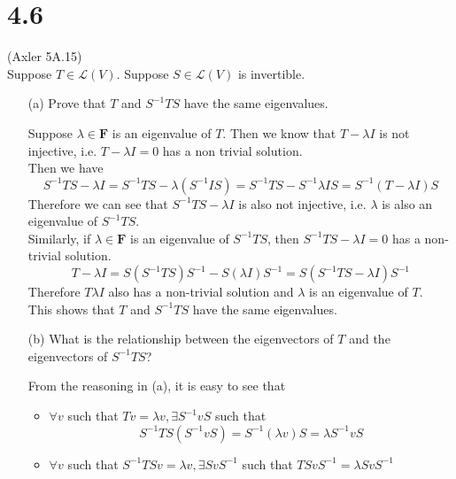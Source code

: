 \documentclass{article}
\begin{document}
\section*{4.6}
(Axler 5A.15)\\
Suppose $T \in \mathcal{L}(V)$. Suppose $S \in \mathcal{L}(V)$ is invertible.
\begin{itemize}
    \item[(a)] Prove that $T$ and $S^{-1}TS$ have the same eigenvalues.
    \begin{addmargin}[1em]{0em}
        Suppose $\lambda \in \mathbf{F}$ is an eigenvalue of $T$. Then we know that $T - \lambda I$ is not injective, i.e. $T - \lambda I = 0$ has a non trivial solution.\\
        Then we have
        \begin{equation*}
            S^{-1}TS - \lambda I = S^{-1}TS - \lambda (S^{-1}IS) = S^{-1}TS - S^{-1}\lambda IS = S^{-1}(T - \lambda I)S
        \end{equation*}
        Therefore we can see that $S^{-1}TS - \lambda I$ is also not injective, i.e. $\lambda$ is also an eigenvalue of $S^{-1}TS$.\\
        Similarly, if $\lambda \in \mathbf{F}$ is an eigenvalue of $S^{-1}TS$, then $S^{-1}TS - \lambda I = 0$ has a non-trivial solution.
        \begin{equation*}
            T - \lambda I = S(S^{-1}TS)S^{-1} - S(\lambda I)S^{-1} = S(S^{-1}TS - \lambda I)S^{-1}
        \end{equation*}
        Therefore $T \lambda I$ also has a non-trivial solution and $\lambda$ is an eigenvalue of $T$.\\
        This shows that $T$ and $S^{-1}TS$ have the same eigenvalues.
    \end{addmargin}
    \item[(b)] What is the relationship between the eigenvectors of $T$ and the eigenvectors of $S^{-1}TS$?
    \begin{addmargin}[1em]{0em}
        From the reasoning in (a), it is easy to see that
        \begin{itemize}
            \item $\forall v$ such that $Tv = \lambda v, \exists S^{-1}vS$ such that
            \begin{equation*}
                S^{-1}TS(S^{-1}vS) = S^{-1}(\lambda v)S = \lambda S^{-1}vS
            \end{equation*}
            \item $\forall v$ such that $S^{-1}TSv = \lambda v, \exists SvS^{-1}$ such that $TSvS^{-1} = \lambda SvS^{-1}$
        \end{itemize}
    \end{addmargin}
\end{itemize}
\end{document}
